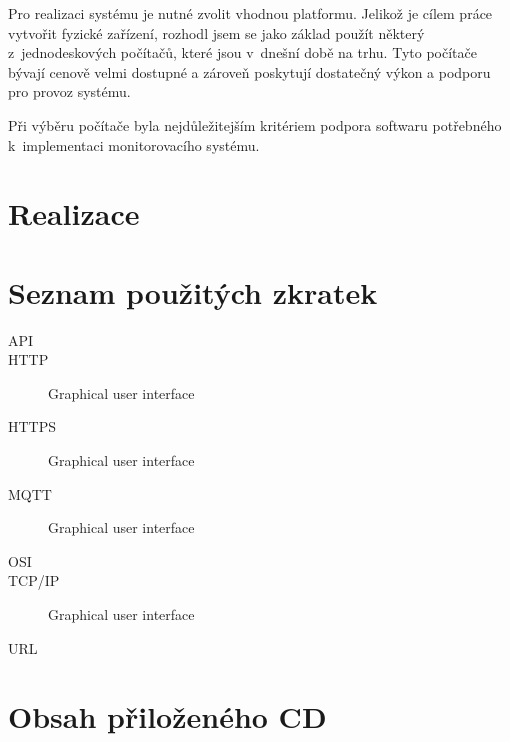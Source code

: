 \documentclass[thesis=M,czech]{FITthesis}[2012/06/26]
\begin{document}
Pro realizaci systému je nutné zvolit vhodnou platformu. Jelikož je cílem práce vytvořit fyzické zařízení, rozhodl jsem se jako základ použít některý z~jednodeskových počítačů, které jsou v~dnešní době na trhu. Tyto počítače bývají cenově velmi dostupné a zároveň poskytují dostatečný výkon a podporu pro provoz systému.

Při výběru počítače byla nejdůležitejším kritériem podpora softwaru potřebného k~implementaci monitorovacího systému. 

\chapter{Realizace}

\begin{conclusion}
\end{conclusion}




\appendix

\chapter{Seznam použitých zkratek}
\begin{description}
	\item[API]
	\item[HTTP] Graphical user interface
    \item[HTTPS] Graphical user interface
    \item[MQTT] Graphical user interface
    \item[OSI]
    \item[TCP/IP] Graphical user interface
    \item[URL]
\end{description}

\chapter{Obsah přiloženého CD}


\begin{figure}
\end{figure}
\end{document}
